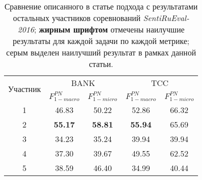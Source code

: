 \begin{table}[htp!]
\centering
\caption{Сравнение описанного в статье подхода с результатами остальных
    участников соревнований {\it SentiRuEval-2016}; {\bf жирным шрифтом}
    отмечены наилучшие результаты для каждой задачи по каждой метрике;
    серым выделен наилучший результат в рамках данной статьи.
}
\label{table:comparison}
\begin{tabular}{ccccc}
\hline
\multicolumn{1}{l|}{\multirow{2}{*}{Участник}}                       & \multicolumn{2}{c|}{BANK}                                                         & \multicolumn{2}{c}{TCC}                                      \\ \cline{2-5}
\multicolumn{1}{l|}{}                                                & \multicolumn{1}{c|}{$F_{1-macro}^{PN}$} & \multicolumn{1}{c|}{$F_{1-micro}^{PN}$} & \multicolumn{1}{c|}{$F_{1-macro}^{PN}$} & $F_{1-micro}^{PN}$ \\ \hline
1                               & 46.83                              & 50.22                                   & 52.86                                   & 66.32                                                        \\
2                               & \textbf{55.17}                     & \textbf{58.81}                          & \textbf{55.94}                          & 65.69                                                        \\
3                               & 34.23                              & 35.24                                   & 39.94                                   & 39.94                                                        \\
4                               & 37.30                              & 39.67                                   & 49.55                                   & 62.52                                                        \\
5                               & 38.59                              & 46.40                                   & 34.99                                   & 40.44                                                        \\

\end{tabular}
\end{table}
